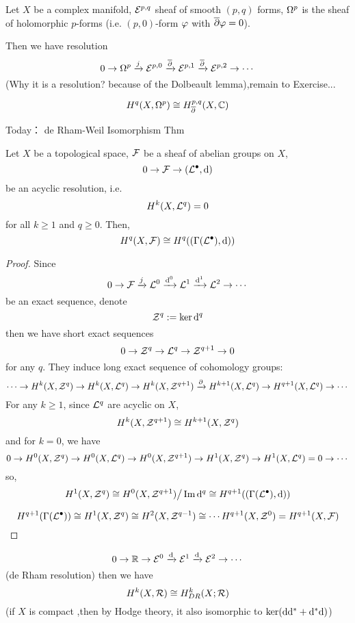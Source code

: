 \begin{example}
Let $X$ be a complex manifold,
$\mathcal{E}^{p,q}$ sheaf of smooth $(p,q)$ forms,
$\Omega^p$ is the sheaf of holomorphic $p$-forms
(i.e. $(p,0)$-form $\varphi$ with $\overline{\partial}\varphi=0$).

Then we have resolution
$$0\to \Omega^p\xrightarrow{j}\mathcal{E}^{p,0}\xrightarrow{\overline{\partial}}\mathcal{E}^{p,1}\xrightarrow{\overline{\partial}}\mathcal{E}^{p,2}\to\cdots$$
(Why it is a resolution?  because of the Dolbeault lemma),remain to Exercise...

$$H^q(X,\Omega^p)\cong H^{p,q}_{\overline{\partial}}(X,\mathbb{C})$$
\end{example}


Today： de Rham-Weil Isomorphism Thm

\begin{thm}
Let $X$ be a topological space, $\mathcal{F}$ be a sheaf of abelian groups on $X$,
$$0\to\mathcal{F}\to(\mathcal{L}^{\bullet},\mathrm{d})$$
be an acyclic resolution, i.e.
$$H^k(X,\mathcal{L}^q)=0$$
for all $k\geq 1$ and $q\geq 0$.
Then,
$$H^q(X,\mathcal{F})\cong H^q((\Gamma(\mathcal{L}^{\bullet}),\mathrm{d}))$$
\end{thm}

\begin{proof}
Since
$$
0\to \mathcal{F}\xrightarrow{j}\mathcal{L}^0\xrightarrow{\mathrm{d}^0}\mathcal{L}^1\xrightarrow{\mathrm{d}^1}\mathcal{L}^2\to\cdots
$$
be an exact sequence, denote
$$\mathcal{Z}^q:=\ker \mathrm{d}^q$$
then we have short exact sequences
$$0\to \mathcal{Z}^q\to\mathcal{L}^q\to\mathcal{Z}^{q+1}\to 0$$
for any $q$. They induce long exact sequence of cohomology groups:
$$\cdots\to H^k(X,\mathcal{Z}^q)\to H^k(X,\mathcal{L}^q)\to H^k(X,\mathcal{Z}^{q+1})\xrightarrow{\partial}
H^{k+1}(X,\mathcal{L}^q)\to H^{q+1}(X,\mathcal{L}^q)\to\cdots$$
For any $k\geq 1$, since $\mathcal{L}^q$ are acyclic on $X$,
$$H^k(X,\mathcal{Z}^{q+1})\cong H^{k+1}(X,\mathcal{Z}^q)$$
and for $k=0$, we have
$$
0\to H^0(X,\mathcal{Z}^q)\to H^0(X,\mathcal{L}^q)\to H^0(X,\mathcal{Z}^{q+1})\to
H^1(X,\mathcal{Z}^q)\to H^1(X,\mathcal{L}^q)=0\to\cdots
$$
so,
$$H^1(X,\mathcal{Z}^q)\cong H^0(X,\mathcal{Z}^{q+1})\big/\operatorname{Im}\mathrm{d}^q
\cong H^{q+1}((\Gamma(\mathcal{L}^{\bullet}),\mathrm{d}))$$

$$H^{q+1}(\Gamma(\mathcal{L}^{\bullet}))\cong H^1(X,\mathcal{Z}^q)\cong H^2(X,\mathcal{Z}^{q-1})\cong\cdots
H^{q+1}(X,\mathcal{Z}^0)=H^{q+1}(X,\mathcal{F})$$
\end{proof}


$$0\to\mathbb{R}\to\mathcal{E}^0\xrightarrow{\mathrm{d}}\mathcal{E}^1\xrightarrow{\mathrm{d}}\mathcal{E}^2\to\cdots$$
(de Rham resolution) then we have
$$H^k(X,\mathcal{R})\cong H_{DR}^k(X;\mathcal{R})$$
(if $X$ is compact ,then by Hodge theory, it also isomorphic to $\ker(\mathrm{d}\mathrm{d}^*+\mathrm{d}^*\mathrm{d})$)

